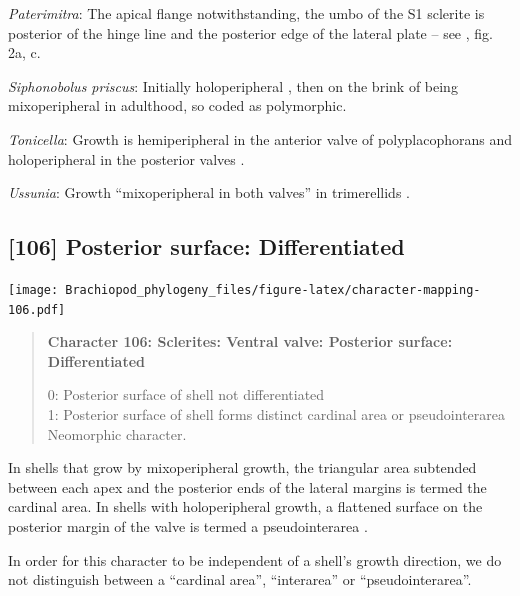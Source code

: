 \documentclass[openany]{book}
\begin{document}
\hypertarget{Paterimitra-coding-105}{}
\emph{Paterimitra}: The apical flange notwithstanding, the umbo of the
S1 sclerite is posterior of the hinge line and the posterior edge of the
lateral plate -- see \citet{Larsson2014iPaterimitra}, fig. 2a, c.

\hypertarget{Siphonobolus_priscus-coding-105}{}
\emph{Siphonobolus priscus}: Initially holoperipheral
\citep[p.~159]{Popov2009Earlyontogeny}, then on the brink of being
mixoperipheral in adulthood, so coded as polymorphic.

\hypertarget{Tonicella-coding-105}{}
\emph{Tonicella}: Growth is hemiperipheral in the anterior valve of
polyplacophorans and holoperipheral in the posterior valves
\citep{Schwabe2010, Connors2012}.

\hypertarget{Ussunia-coding-105}{}
\emph{Ussunia}: Growth ``mixoperipheral in both valves'' in trimerellids
\citep{Williams2000LinguliformeaCraniiformea, Popov1997}.

\subsection*{{[}106{]} Posterior surface:
Differentiated}\label{posterior-surface-differentiated-1}

\texttt{[image: Brachiopod\_phylogeny\_files/figure-latex/character-mapping-106.pdf]}

\begin{quote}
\textbf{Character 106: Sclerites: Ventral valve: Posterior surface:
Differentiated}

0: Posterior surface of shell not differentiated\\
1: Posterior surface of shell forms distinct cardinal area or
pseudointerarea\\
Neomorphic character.
\end{quote}

In shells that grow by mixoperipheral growth, the triangular area
subtended between each apex and the posterior ends of the lateral
margins is termed the cardinal area. In shells with holoperipheral
growth, a flattened surface on the posterior margin of the valve is
termed a pseudointerarea
\citep[paraphrasing][]{Williams1997Introduction}.

In order for this character to be independent of a shell's growth
direction, we do not distinguish between a ``cardinal area'',
``interarea'' or ``pseudointerarea''.
\end{document}
